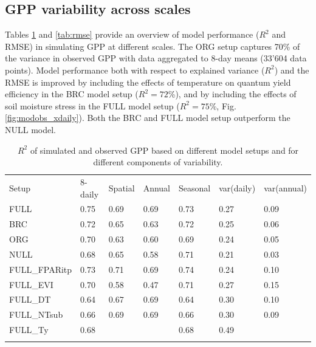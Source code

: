 \documentclass[gmd, manuscript]{copernicus}
\begin{document}
\subsection{GPP variability across scales}
\label{sec:results_gpp}


Tables \ref{tab:rsq} and \ref{tab:rmse} provide an overview of model performance ($R^2$ and RMSE) in simulating GPP at different scales. The ORG setup captures 70\% of the variance in observed GPP with data aggregated to 8-day means (33'604 data points). Model performance both with respect to explained variance ($R^2$) and the RMSE is improved by including the effects of temperature on quantum yield efficiency in the BRC model setup  ($R^2 = 72$\%), and by including the effects of soil moisture stress in the FULL model setup ($R^2 = 75$\%, Fig. \ref{fig:modobs_xdaily}). Both the BRC and FULL model setup outperform the NULL model.

\begin{table}[t]
\caption{$R^2$ of simulated and observed GPP based on different model setups and for different components of variability.} 
\begin{tabular}{lllllll}
  \tophline
  Setup & 8-daily & Spatial & Annual & Seasonal & var(daily) & var(annual) \\ 
  \middlehline
  FULL & 0.75 & 0.69 & 0.69 & 0.73 & 0.27 & 0.09 \\ 
  BRC & 0.72 & 0.65 & 0.63 & 0.72 & 0.25 & 0.06 \\ 
  ORG & 0.70 & 0.63 & 0.60 & 0.69 & 0.24 & 0.05 \\ 
  NULL & 0.68 & 0.65 & 0.58 & 0.71 & 0.21 & 0.03 \\ 
  \middlehline
  FULL\_FPARitp & 0.73 & 0.71 & 0.69 & 0.74 & 0.24 & 0.10 \\ 
  FULL\_EVI & 0.70 & 0.58 & 0.47 & 0.71 & 0.27 & 0.15 \\ 
  \middlehline
  FULL\_DT & 0.64 & 0.67 & 0.69 & 0.64 & 0.30 & 0.10 \\ 
  FULL\_NTsub & 0.66 & 0.69 & 0.69 & 0.66 & 0.30 & 0.09 \\ 
  FULL\_Ty & 0.68 &  &  & 0.68 & 0.49 &  \\ 
  \bottomhline
  \end{tabular}
\label{tab:rsq}
\end{table}
\end{document}
